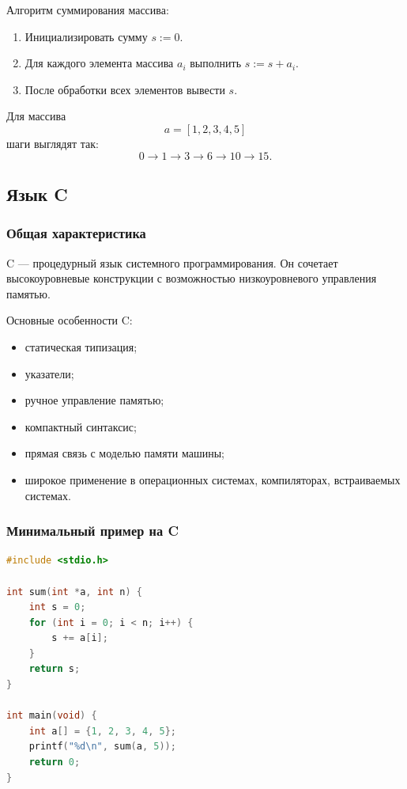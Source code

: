 \documentclass[12pt,a4paper]{article}
\begin{document}
Алгоритм суммирования массива:
\begin{enumerate}
    \item Инициализировать сумму $s := 0$.
    \item Для каждого элемента массива $a_i$ выполнить $s := s + a_i$.
    \item После обработки всех элементов вывести $s$.
\end{enumerate}

Для массива
$$
a = [1,2,3,4,5]
$$
шаги выглядят так:
$$
0 \to 1 \to 3 \to 6 \to 10 \to 15.
$$

\subsection{Язык C}

\subsubsection{Общая характеристика}

C --- процедурный язык системного программирования. Он сочетает высокоуровневые конструкции с возможностью низкоуровневого управления памятью.

Основные особенности C:
\begin{itemize}
    \item статическая типизация;
    \item указатели;
    \item ручное управление памятью;
    \item компактный синтаксис;
    \item прямая связь с моделью памяти машины;
    \item широкое применение в операционных системах, компиляторах, встраиваемых системах.
\end{itemize}

\subsubsection{Минимальный пример на C}

\begin{lstlisting}[language=C]
#include <stdio.h>

int sum(int *a, int n) {
    int s = 0;
    for (int i = 0; i < n; i++) {
        s += a[i];
    }
    return s;
}

int main(void) {
    int a[] = {1, 2, 3, 4, 5};
    printf("%d\n", sum(a, 5));
    return 0;
}
\end{lstlisting}
\end{document}
